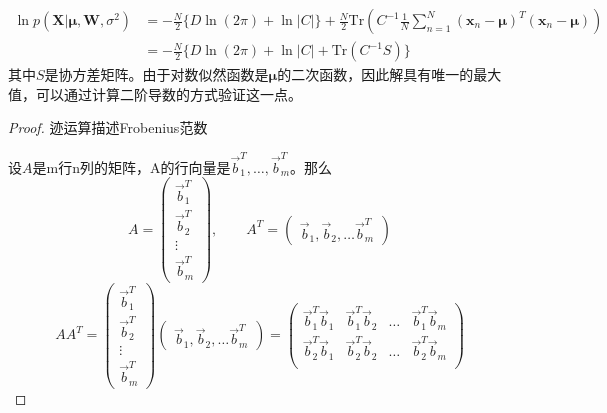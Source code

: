\begin{equation}
\begin{aligned}
	\ln p(\boldsymbol{X}|\boldsymbol{\mu},\boldsymbol{W},\sigma^2)&=-\frac{N}{2}\{D\ln (2\pi)+\ln |C|\}+\frac{N}{2}\mathrm{Tr}\left(C^{-1}\frac{1}{N}\sum_{n=1}^{N}(\boldsymbol{x}_n-\boldsymbol{\mu})^T(\boldsymbol{x}_n-\boldsymbol{\mu}) \right)\\
	&=-\frac{N}{2}\{D\ln (2\pi)+\ln |C|+\mathrm{Tr}(C^{-1}S) \}
\end{aligned}
\end{equation}
其中$S$是协方差矩阵。由于对数似然函数是$\boldsymbol{\mu}$的二次函数，因此解具有唯一的最大值，可以通过计算二阶导数的方式验证这一点。

\begin{proof}迹运算描述Frobenius范数
	
	设$A$是m行n列的矩阵，A的行向量是$\overrightarrow{b}_1^T,\dots,\overrightarrow{b}_m^T$。那么 
	\begin{equation}
		A=\begin{pmatrix}
			\overrightarrow{b}_1^T\\
			\overrightarrow{b}_2^T\\
			\vdots\\
			\overrightarrow{b}_m^T
		\end{pmatrix},\qquad 
		A^T=\begin{pmatrix}
			\overrightarrow{b}_1,
			\overrightarrow{b}_2,
			\dots
			\overrightarrow{b}_m^T
		\end{pmatrix}
	\end{equation}
	\begin{equation}
		AA^T=\begin{pmatrix}
			\overrightarrow{b}_1^T\\
			\overrightarrow{b}_2^T\\
			\vdots\\
			\overrightarrow{b}_m^T
		\end{pmatrix}\begin{pmatrix}
			\overrightarrow{b}_1,
			\overrightarrow{b}_2,
			\dots
			\overrightarrow{b}_m^T
		\end{pmatrix}=\begin{pmatrix}
			\overrightarrow{b}_1^T\overrightarrow{b}_1&\overrightarrow{b}_1^T\overrightarrow{b}_2&
			\dots&
			\overrightarrow{b}_1^T\overrightarrow{b}_m\\
			\overrightarrow{b}_2^T\overrightarrow{b}_1&\overrightarrow{b}_2^T\overrightarrow{b}_2&
			\dots&
			\overrightarrow{b}_2^T\overrightarrow{b}_m\\

\end{pmatrix}
\end{equation}
\end{proof}
